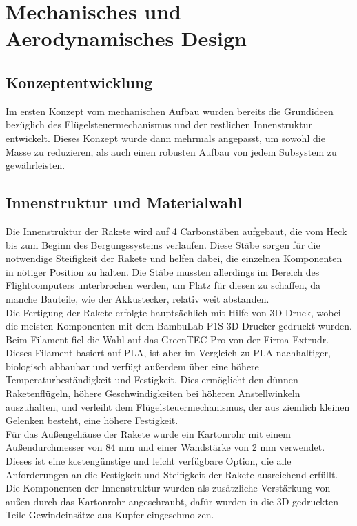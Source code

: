 \chapter{Mechanisches und Aerodynamisches Design}
\label{ch:cad}

\section{Konzeptentwicklung}
\label{sec:concept}
Im ersten Konzept vom mechanischen Aufbau wurden bereits die Grundideen bezüglich des Flügelsteuermechanismus und der restlichen Innenstruktur entwickelt. Dieses Konzept wurde dann mehrmals angepasst, um sowohl die Masse zu reduzieren, als auch einen robusten Aufbau von jedem Subsystem zu gewährleisten.

\section{Innenstruktur und Materialwahl}
\label{sec:internal_structure}
Die Innenstruktur der Rakete wird auf 4 Carbonstäben aufgebaut, die vom Heck bis zum Beginn des Bergungssystems verlaufen. Diese Stäbe sorgen für die notwendige Steifigkeit der Rakete und helfen dabei, die einzelnen Komponenten in nötiger Position zu halten. Die Stäbe mussten allerdings im Bereich des Flightcomputers unterbrochen werden, um Platz für diesen zu schaffen, da manche Bauteile, wie der Akkustecker, relativ weit abstanden.
\\
Die Fertigung der Rakete erfolgte hauptsächlich mit Hilfe von 3D-Druck, wobei die meisten Komponenten mit dem BambuLab P1S 3D-Drucker gedruckt wurden. Beim Filament fiel die Wahl auf das GreenTEC Pro von der Firma Extrudr. Dieses Filament basiert auf PLA, ist aber im Vergleich zu PLA nachhaltiger, biologisch abbaubar und verfügt außerdem über eine höhere Temperaturbeständigkeit und Festigkeit. Dies ermöglicht den dünnen Raketenflügeln, höhere Geschwindigkeiten bei höheren Anstellwinkeln auszuhalten, und verleiht dem Flügelsteuermechanismus, der aus ziemlich kleinen Gelenken besteht, eine höhere Festigkeit.
\\
Für das Außengehäuse der Rakete wurde ein Kartonrohr mit einem Außendurchmesser von 84 mm und einer Wandstärke von 2 mm verwendet. Dieses ist eine kostengünstige und leicht verfügbare Option, die alle Anforderungen an die Festigkeit und Steifigkeit der Rakete ausreichend erfüllt. Die Komponenten der Innenstruktur wurden als zusätzliche Verstärkung von außen durch das Kartonrohr angeschraubt, dafür wurden in die 3D-gedruckten Teile Gewindeinsätze aus Kupfer eingeschmolzen.

